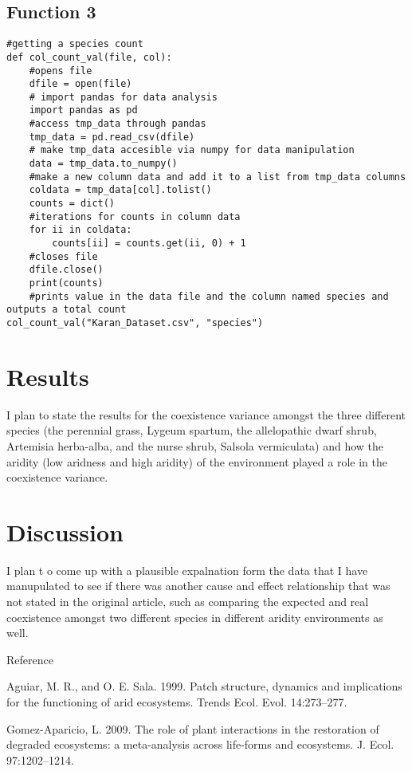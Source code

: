 \documentclass[letterpaper]{article}
\begin{document}
\subsection{Function 3 }
\begin{verbatim}
#getting a species count
def col_count_val(file, col):
    #opens file
    dfile = open(file)
    # import pandas for data analysis
    import pandas as pd
    #access tmp_data through pandas
    tmp_data = pd.read_csv(dfile)
    # make tmp_data accesible via numpy for data manipulation
    data = tmp_data.to_numpy()
    #make a new column data and add it to a list from tmp_data columns
    coldata = tmp_data[col].tolist()
    counts = dict()
    #iterations for counts in column data
    for ii in coldata:
        counts[ii] = counts.get(ii, 0) + 1
    #closes file
    dfile.close()
    print(counts)
    #prints value in the data file and the column named species and outputs a total count
col_count_val("Karan_Dataset.csv", "species")

\end{verbatim}


\section{Results}
I plan to state the results for the coexistence variance amongst the three different species (the perennial grass, Lygeum
spartum, the allelopathic dwarf shrub, Artemisia herba-alba, and the nurse shrub, Salsola vermiculata) and how the aridity (low aridness and high aridity)  of the environment played a role in the coexistence variance.

\section{Discussion}
I plan t o come up with a plausible expalnation form the data that I have manupulated to see if there was another cause and effect relationship that was not stated in the original article, such as comparing the expected and real coexistence amongst two different species in different aridity environments as well.

\newpage
Reference


Aguiar, M. R., and O. E. Sala. 1999. Patch structure, dynamics and implications for the functioning of arid ecosystems. Trends Ecol. Evol. 14:273–277.

Gomez-Aparicio, L. 2009. The role of plant interactions in the restoration of degraded ecosystems: a meta-analysis across life-forms and ecosystems. J. Ecol. 97:1202–1214.
\end{document}
